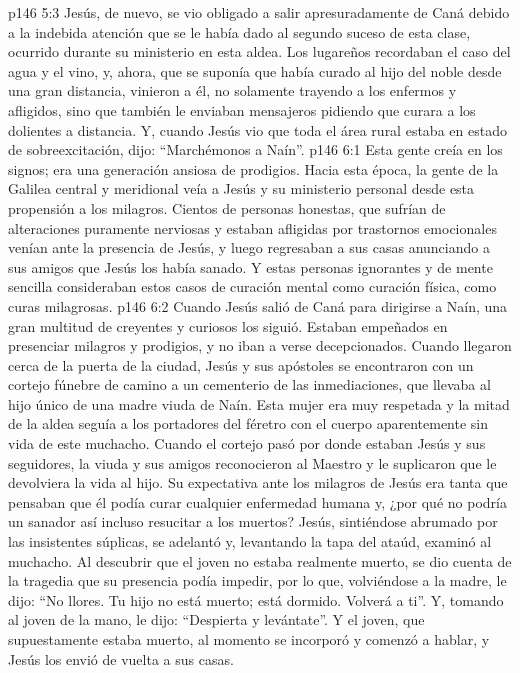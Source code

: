 \vs p146 5:3 Jesús, de nuevo, se vio obligado a salir apresuradamente de Caná debido a la indebida atención que se le había dado al segundo suceso de esta clase, ocurrido durante su ministerio en esta aldea. Los lugareños recordaban el caso del agua y el vino, y, ahora, que se suponía que había curado al hijo del noble desde una gran distancia, vinieron a él, no solamente trayendo a los enfermos y afligidos, sino que también le enviaban mensajeros pidiendo que curara a los dolientes a distancia. Y, cuando Jesús vio que toda el área rural estaba en estado de sobreexcitación, dijo: “Marchémonos a Naín”.
\vs p146 6:1 Esta gente creía en los signos; era una generación ansiosa de prodigios. Hacia esta época, la gente de la Galilea central y meridional veía a Jesús y su ministerio personal desde esta propensión a los milagros. Cientos de personas honestas, que sufrían de alteraciones puramente nerviosas y estaban afligidas por trastornos emocionales venían ante la presencia de Jesús, y luego regresaban a sus casas anunciando a sus amigos que Jesús los había sanado. Y estas personas ignorantes y de mente sencilla consideraban estos casos de curación mental como curación física, como curas milagrosas.
\vs p146 6:2 \pc Cuando Jesús salió de Caná para dirigirse a Naín, una gran multitud de creyentes y curiosos los siguió. Estaban empeñados en presenciar milagros y prodigios, y no iban a verse decepcionados. Cuando llegaron cerca de la puerta de la ciudad, Jesús y sus apóstoles se encontraron con un cortejo fúnebre de camino a un cementerio de las inmediaciones, que llevaba al hijo único de una madre viuda de Naín. Esta mujer era muy respetada y la mitad de la aldea seguía a los portadores del féretro con el cuerpo aparentemente sin vida de este muchacho. Cuando el cortejo pasó por donde estaban Jesús y sus seguidores, la viuda y sus amigos reconocieron al Maestro y le suplicaron que le devolviera la vida al hijo. Su expectativa ante los milagros de Jesús era tanta que pensaban que él podía curar cualquier enfermedad humana y, ¿por qué no podría un sanador así incluso resucitar a los muertos? Jesús, sintiéndose abrumado por las insistentes súplicas, se adelantó y, levantando la tapa del ataúd, examinó al muchacho. Al descubrir que el joven no estaba realmente muerto, se dio cuenta de la tragedia que su presencia podía impedir, por lo que, volviéndose a la madre, le dijo: “No llores. Tu hijo no está muerto; está dormido. Volverá a ti”. Y, tomando al joven de la mano, le dijo: “Despierta y levántate”. Y el joven, que supuestamente estaba muerto, al momento se incorporó y comenzó a hablar, y Jesús los envió de vuelta a sus casas.
